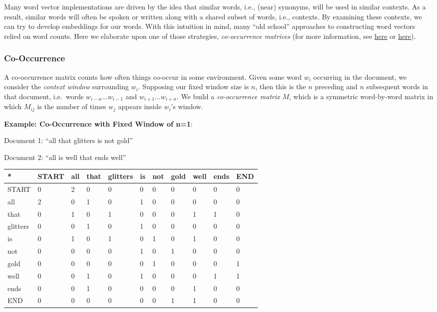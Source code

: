 \documentclass[18pt]{article}
\begin{document}
Many word vector implementations are driven by the idea that similar
words, i.e., (near) synonyms, will be used in similar contexts. As a
result, similar words will often be spoken or written along with a
shared subset of words, i.e., contexts. By examining these contexts, we
can try to develop embeddings for our words. With this intuition in
mind, many ``old school'' approaches to constructing word vectors relied
on word counts. Here we elaborate upon one of those strategies,
\emph{co-occurrence matrices} (for more information, see
\href{http://web.stanford.edu/class/cs124/lec/vectorsemantics.video.pdf}{here}
or
\href{https://medium.com/data-science-group-iitr/word-embedding-2d05d270b285}{here}).

    \hypertarget{co-occurrence}{%
\subsubsection{Co-Occurrence}\label{co-occurrence}}

A co-occurrence matrix counts how often things co-occur in some
environment. Given some word \(w_i\) occurring in the document, we
consider the \emph{context window} surrounding \(w_i\). Supposing our
fixed window size is \(n\), then this is the \(n\) preceding and \(n\)
subsequent words in that document, i.e.~words \(w_{i-n} \dots w_{i-1}\)
and \(w_{i+1} \dots w_{i+n}\). We build a \emph{co-occurrence matrix}
\(M\), which is a symmetric word-by-word matrix in which \(M_{ij}\) is
the number of times \(w_j\) appears inside \(w_i\)'s window.

\textbf{Example: Co-Occurrence with Fixed Window of n=1}:

Document 1: ``all that glitters is not gold''

Document 2: ``all is well that ends well''

\begin{longtable}[]{@{}lllllllllll@{}}
\toprule
* & START & all & that & glitters & is & not & gold & well & ends &
END\tabularnewline
\midrule
\endhead
START & 0 & 2 & 0 & 0 & 0 & 0 & 0 & 0 & 0 & 0\tabularnewline
all & 2 & 0 & 1 & 0 & 1 & 0 & 0 & 0 & 0 & 0\tabularnewline
that & 0 & 1 & 0 & 1 & 0 & 0 & 0 & 1 & 1 & 0\tabularnewline
glitters & 0 & 0 & 1 & 0 & 1 & 0 & 0 & 0 & 0 & 0\tabularnewline
is & 0 & 1 & 0 & 1 & 0 & 1 & 0 & 1 & 0 & 0\tabularnewline
not & 0 & 0 & 0 & 0 & 1 & 0 & 1 & 0 & 0 & 0\tabularnewline
gold & 0 & 0 & 0 & 0 & 0 & 1 & 0 & 0 & 0 & 1\tabularnewline
well & 0 & 0 & 1 & 0 & 1 & 0 & 0 & 0 & 1 & 1\tabularnewline
ends & 0 & 0 & 1 & 0 & 0 & 0 & 0 & 1 & 0 & 0\tabularnewline
END & 0 & 0 & 0 & 0 & 0 & 0 & 1 & 1 & 0 & 0\tabularnewline
\bottomrule
\end{longtable}
\end{document}
